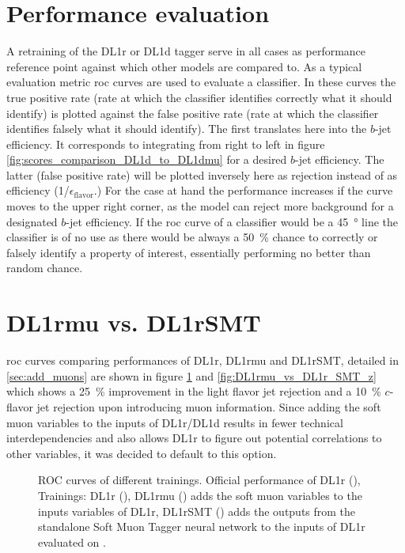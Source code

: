 \section{Performance evaluation}
A retraining of the DL1r or DL1d tagger serve in all cases as performance reference point against which other models are compared to. As a typical evaluation metric \ac{roc} curves are used to evaluate a classifier. In these curves the true positive rate (rate at which the classifier identifies correctly what it should identify) is plotted against the false positive rate (rate at which the classifier identifies falsely what it should identify). The first translates here into the $b$-jet efficiency. It corresponds to integrating from right to left in figure \ref{fig:scores_comparison_DL1d_to_DL1dmu} for a desired $b$-jet efficiency. The latter (false positive rate) will be plotted inversely here as rejection instead of as efficiency (1/$\epsilon_\mathrm{flavor}$.) For the case at hand the performance increases if the curve moves to the upper right corner, as the model can reject more background for a designated $b$-jet efficiency. If the \ac{roc} curve of a classifier would be a \qty{45}{\degree} line the classifier is of no use as there would be always a \qty{50}{\percent} chance to correctly or falsely identify a property of interest, essentially performing no better than random chance.

\section{DL1rmu vs. DL1rSMT}
\ac{roc} curves comparing performances of DL1r, DL1rmu and DL1rSMT, detailed in \ref{sec:add_muons} are shown in figure \ref{fig:DL1rmu_vs_DL1r_SMT_tt} and \ref{fig:DL1rmu_vs_DL1r_SMT_z} which shows a \qty{25}{\percent} improvement in the light flavor jet rejection and a \qty{10}{\percent} $c$-flavor jet rejection upon introducing muon information.  Since adding the soft muon variables to the inputs of DL1r/DL1d results in fewer technical interdependencies and also allows DL1r to figure out potential correlations to other variables, it was decided to default to this option.

\begin{figure}[]
  \centering
  \caption{ROC curves of different trainings. Official performance of DL1r (), Trainings: DL1r (), DL1rmu () adds the soft muon variables to the inputs variables of DL1r,  DL1rSMT () adds the outputs from the standalone Soft Muon Tagger neural network to the inputs of DL1r evaluated on \ttbar. }
  \label{fig:DL1rmu_vs_DL1r_SMT_tt}
\end{figure}

